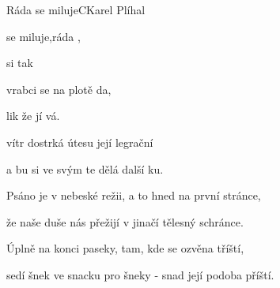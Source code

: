 \setcounter{page}{72}
\begin{song}{Ráda se miluje}{C}{Karel Plíhal}

\begin{SBChorus}

 se miluje,ráda ,

 si  tak

vrabci se na plotě da,

lik že  jí vá.

\end{SBChorus}

\begin{SBVerse}

 vítr dostrká  útesu  její legrační 

a bu si ve svým te dělá  další ku.

\end{SBVerse}

\begin{SBChorus}

\end{SBChorus}

\begin{SBVerse}

Psáno je v nebeské režii, a to hned na první stránce,

že naše duše nás přežijí v jinačí tělesný schránce.

\end{SBVerse}

\begin{SBChorus}

\end{SBChorus}

\begin{SBVerse}

Úplně na konci paseky, tam, kde se ozvěna tříští,

sedí šnek ve snacku pro šneky - snad její podoba příští.

\end{SBVerse}

\begin{SBChorus}

\end{SBChorus}

\end{song}

\clearpage
